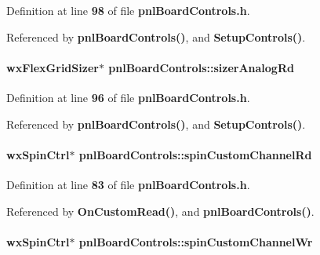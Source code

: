 Definition at line {\bf 98} of file {\bf pnl\+Board\+Controls.\+h}.



Referenced by {\bf pnl\+Board\+Controls()}, and {\bf Setup\+Controls()}.

\paragraph[{sizer\+Analog\+Rd}]{\setlength{\rightskip}{0pt plus 5cm}wx\+Flex\+Grid\+Sizer$\ast$ pnl\+Board\+Controls\+::sizer\+Analog\+Rd\hspace{0.3cm}{\ttfamily [protected]}}\label{classpnlBoardControls_a15389ede8a66e5da357dcc07e89f209f}


Definition at line {\bf 96} of file {\bf pnl\+Board\+Controls.\+h}.



Referenced by {\bf pnl\+Board\+Controls()}, and {\bf Setup\+Controls()}.

\paragraph[{spin\+Custom\+Channel\+Rd}]{\setlength{\rightskip}{0pt plus 5cm}wx\+Spin\+Ctrl$\ast$ pnl\+Board\+Controls\+::spin\+Custom\+Channel\+Rd\hspace{0.3cm}{\ttfamily [protected]}}\label{classpnlBoardControls_a445e7cca9d66055c9bd1e3ff6b4b4162}


Definition at line {\bf 83} of file {\bf pnl\+Board\+Controls.\+h}.



Referenced by {\bf On\+Custom\+Read()}, and {\bf pnl\+Board\+Controls()}.

\paragraph[{spin\+Custom\+Channel\+Wr}]{\setlength{\rightskip}{0pt plus 5cm}wx\+Spin\+Ctrl$\ast$ pnl\+Board\+Controls\+::spin\+Custom\+Channel\+Wr\hspace{0.3cm}{\ttfamily [protected]}}\label{classpnlBoardControls_af02414a3819946da540933392e834579}



